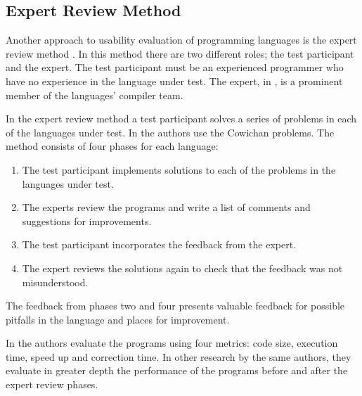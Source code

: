 \subsection{Expert Review Method} \label{sec:expert-review}
Another approach to usability evaluation of programming languages is the expert review method \cite{nanz2013examining}. In this method there are two different roles; the test participant and the expert. The test participant must be an experienced programmer who have no experience in the language under test. The expert, in \cite{nanz2013examining}, is a prominent member of the languages' compiler team.

In the expert review method a test participant solves a series of problems in each of the languages under test. In \cite{nanz2013examining} the authors use the Cowichan problems\cite{wilson1995assessing}. The method consists of four phases for each language:
\begin{enumerate}
    \item The test participant implements solutions to each of the problems in the languages under test.
    \item The experts review the programs and write a list of comments and suggestions for improvements.
    \item The test participant incorporates the feedback from the expert.
    \item The expert reviews the solutions again to check that the feedback was not misunderstood.
\end{enumerate}
The feedback from phases two and four presents valuable feedback for possible pitfalls in the language and places for improvement.

In \cite{nanz2013examining} the authors evaluate the programs using four metrics: code size, execution time, speed up and correction time. In other research by the same authors, they evaluate in greater depth the performance of the programs before and after the expert review phases\cite{nanz2013benchmarking}.
